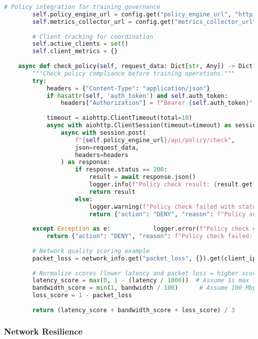 \begin{lstlisting}[language=Python, caption=Training Loop with Loss Tracking]
        # Policy integration for training governance
        self.policy_engine_url = config.get("policy_engine_url", "http://localhost:5000")
        self.metrics_collector_url = config.get("metrics_collector_url", "http://localhost:8002")
        
        # Client tracking for coordination
        self.active_clients = set()
        self.client_metrics = {}
        
    async def check_policy(self, request_data: Dict[str, Any]) -> Dict[str, Any]:
        """Check policy compliance before training operations."""
        try:
            headers = {"Content-Type": "application/json"}
            if hasattr(self, 'auth_token') and self.auth_token:
                headers["Authorization"] = f"Bearer {self.auth_token}"
            
            timeout = aiohttp.ClientTimeout(total=10)
            async with aiohttp.ClientSession(timeout=timeout) as session:
                async with session.post(
                    f"{self.policy_engine_url}/api/policy/check",
                    json=request_data,
                    headers=headers
                ) as response:
                    if response.status == 200:
                        result = await response.json()
                        logger.info(f"Policy check result: {result.get('action', 'UNKNOWN')}")
                        return result
                    else:
                        logger.warning(f"Policy check failed with status {response.status}")
                        return {"action": "DENY", "reason": f"Policy service error: {response.status}"}
        
        except Exception as e:            logger.error(f"Policy check error: {e}")
            return {"action": "DENY", "reason": f"Policy check failed: {str(e)}"}
        
        # Network quality scoring example
        packet_loss = network_info.get("packet_loss", {}).get(client_ip, 1.0)
        
        # Normalize scores (lower latency and packet loss = higher score)
        latency_score = max(0, 1 - (latency / 1000))  # Assume 1s max latency
        bandwidth_score = min(1, bandwidth / 100)      # Assume 100 Mbps max
        loss_score = 1 - packet_loss
        
        return (latency_score + bandwidth_score + loss_score) / 3
\end{lstlisting}

\subsubsection{Network Resilience}

